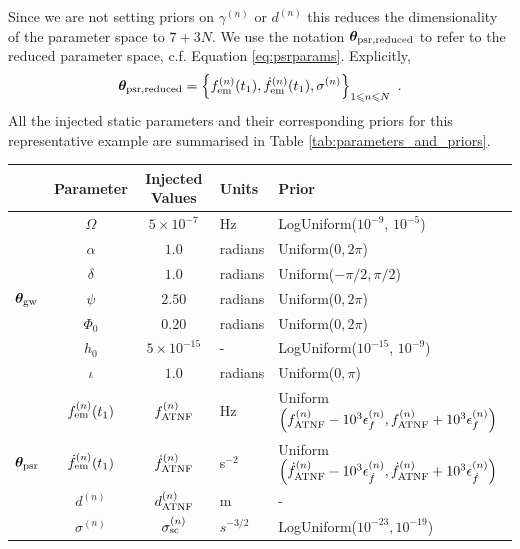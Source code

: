 \documentclass[fleqn,usenatbib,useAMS]{mnras}
\begin{document}
Since we are not setting priors on $\gamma^{(n)}$ or $d^{(n)}$ this reduces the dimensionality of the parameter space to $7 + 3N$. We use the notation $\boldsymbol{\theta}_{\rm psr, reduced}$ to refer to the reduced parameter space, c.f. Equation \ref{eq:psrparams}. Explicitly, 
\begin{equation}
	\boldsymbol{\theta}_{\rm psr, reduced} = \left \{ f_{\rm em}^{(n)}(t_1),\dot{f}_{\rm em}^{(n)}(t_1),\sigma^{(n)}\right\}_{1\leq n \leq N} \ .
\end{equation}
All the injected static parameters and their corresponding priors for this representative example are summarised in Table \ref{tab:parameters_and_priors}.
\begin{table}
	\centering
	\begin{tabular}{lccll}
		\toprule
		&Parameter & Injected Values & Units & Prior  \\
		\hline
		\multirow{7}{2mm}{$\boldsymbol{\theta}_{\rm gw}$} & $\Omega$       & $5 \times 10^{-7}$ & Hz & LogUniform($10^{-9}$, $10^{-5}$) \\
	  & $\alpha$          & $1.0$  & radians & Uniform($0, 2 \pi $)\\
	  & $\delta$              & $1.0$  & radians & Uniform($-\pi/2, \pi/2$) \\
	  & $\psi$              & $2.50$ & radians & Uniform($0, 2 \pi $) \\
	  & $\Phi_0$          & $0.20$ & radians & Uniform($0, 2 \pi $) \\
	  & $h_0$            & $5 \times 10^{-15}$ & - & LogUniform($10^{-15}$, $10^{-9}$) \\
	  & $\iota$             & $1.0$ & radians & Uniform($0, \pi$) \\ 
		\hline
		\multirow{5}{2mm}{$\boldsymbol{\theta}_{\rm psr}$} & $f_{\rm em}^{(n)} (t_1)$       & $f_{\rm ATNF}^{(n)}$ & Hz & Uniform$\left( f_{\rm ATNF}^{(n)} - 10^3 \epsilon^{(n)}_{f}, f_{\rm ATNF}^{(n)} + 10^3 \epsilon^{(n)}_{f} \right)$ \\
		& $\dot{f}_{\rm em}^{(n)} (t_1)$       & $\dot{f}_{\rm ATNF}^{(n)}$ & s$^{-2}$ & Uniform$\left( \dot{f}_{\rm ATNF}^{(n)} - 10^3 \epsilon^{(n)}_{\dot{f}}, \dot{f}_{\rm ATNF}^{(n)} + 10^3 \epsilon^{(n)}_{\dot{f}} \right)$ \\
		&  $d^{(n)}$       &$d_{\rm ATNF}^{(n)}$  & m & - \\
		& $\sigma^{(n)}$              & $\sigma_{\rm sc}^{(n)}$ & $s^{-3/2}$ & LogUniform($10^{-23}, 10^{-19}$) \\

\end{tabular}
\end{table}
\end{document}
